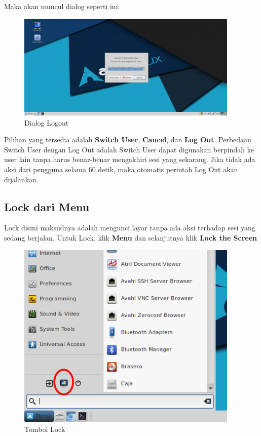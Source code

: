 \documentclass[12pt,]{article}
\begin{document}
	Maka akan muncul dialog seperti ini:

	\begin{figure}[h]
		\centering
		\includegraphics[width=300pt]{png/logoutdlg}
		\caption{Dialog Logout}
	\end{figure}

	Pilihan yang tersedia adalah \textbf{Switch User}, \textbf{Cancel}, dan \textbf{Log Out}.
	Perbedaan Switch User dengan Log Out adalah Switch User dapat digunakan berpindah ke user lain tanpa harus benar-benar mengakhiri sesi yang sekarang.
	Jika tidak ada aksi dari pengguna selama 60 detik, maka otomatis perintah Log Out akan dijalankan.

	\newpage

	\subsection{Lock dari Menu}

	Lock disini maksudnya adalah mengunci layar tanpa ada aksi terhadap sesi yang sedang berjalan.
	Untuk Lock, klik \textbf{Menu} dan selanjutnya klik \textbf{Lock the Screen}

	\begin{figure}[h]
		\centering
		\includegraphics[width=300pt]{png/lock}
		\caption{Tombol Lock}
	\end{figure}
\end{document}
